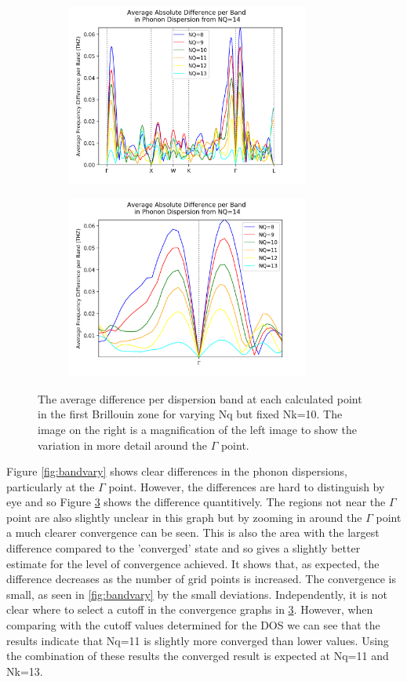 \documentclass[12pt]{article}
\begin{document}
\begin{figure}[!htpb]
	\begin{subfigure}{0.5\textwidth}
		\centering
		\includegraphics[width=8cm]{../Figures/disp_convergence.png}
		\subcaption{}
		\label{fig:dfptbandwhole}
	\end{subfigure}%
	\begin{subfigure}{0.5\textwidth}
		\centering
		\includegraphics[width=8cm]{../Figures/disp_convergence_zoom.png}
		\subcaption{}
		\label{fig:dfptbandzoom}
	\end{subfigure}%
	\caption{The average difference per dispersion band at each calculated point in the first Brillouin zone for varying Nq but fixed Nk=10. The image on the right is a magnification of the left image to show the variation in more detail around the $\Gamma$ point.}
	\label{fig:dfptband}
\end{figure}

\bigskip

\noindent Figure \ref{fig:bandvary} shows clear differences in the phonon dispersions, particularly at the $\Gamma$ point. However, the differences are hard to distinguish by eye and so Figure \ref{fig:dfptband} shows the difference quantitively. The regions not near the $\Gamma$ point are also slightly unclear in this graph but by zooming in around the $\Gamma$ point a much clearer convergence can be seen. This is also the area with the largest difference compared to the 'converged' state and so gives a slightly better estimate for the level of convergence achieved. It shows that, as expected, the difference decreases as the number of grid points is increased. The convergence is small, as seen in \ref{fig:bandvary} by the small deviations. Independently, it is not clear where to select a cutoff in the convergence graphs in \ref{fig:dfptband}. However, when comparing with the cutoff values determined for the DOS we can see that the results indicate that Nq=11 is slightly more converged than lower values. Using the combination of these results the converged result is expected at Nq=11 and Nk=13.
\end{document}
